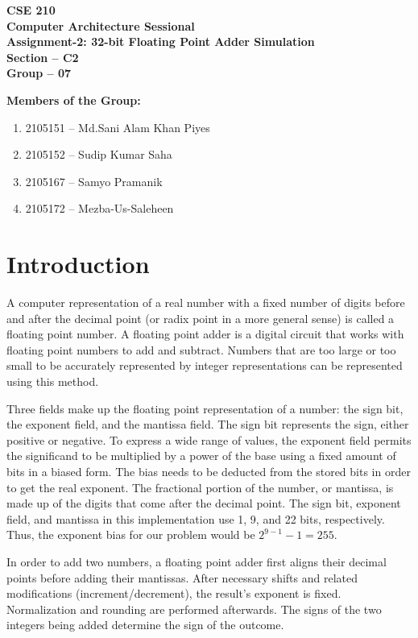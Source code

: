 \documentclass[a4paper,12pt]{article}
\begin{document}
\begin{center}
    \textbf{CSE 210} \\
    \textbf{Computer Architecture Sessional} \\[.8cm]
    \textbf{Assignment-2: 32-bit Floating Point Adder Simulation} \\[1cm]
    \textbf{Section -- C2} \\
    \textbf{Group -- 07} \\[5cm]
\end{center}

\noindent\textbf{Members of the Group:}
\begin{enumerate}
    \item 2105151 -- Md.Sani Alam Khan Piyes
    \item 2105152 -- Sudip Kumar Saha
    \item 2105167 -- Samyo Pramanik
    \item 2105172 -- Mezba-Us-Saleheen
\end{enumerate}
\newpage

\section{Introduction}

A computer representation of a real number with a fixed number of digits before
and after the decimal point (or radix point in a more general sense) is called
a floating point number. A floating point adder is a digital circuit that works
with floating point numbers to add and subtract. Numbers that are too large or
too small to be accurately represented by integer representations can be
represented using this method.

Three fields make up the floating point representation of a number: the sign
bit, the exponent field, and the mantissa field. The sign bit represents the
sign, either positive or negative. To express a wide range of values, the
exponent field permits the significand to be multiplied by a power of the base
using a fixed amount of bits in a biased form. The bias needs to be deducted
from the stored bits in order to get the real exponent. The fractional portion
of the number, or mantissa, is made up of the digits that come after the
decimal point. The sign bit, exponent field, and mantissa in this
implementation use 1, 9, and 22 bits, respectively. Thus, the exponent bias for
our problem would be $2^{9 - 1} - 1 = 255$.

In order to add two numbers, a floating point adder first aligns their decimal
points before adding their mantissas. After necessary shifts and related
modifications (increment/decrement), the result’s exponent is fixed.
Normalization and rounding are performed afterwards. The signs of the two
integers being added determine the sign of the outcome.
\end{document}
